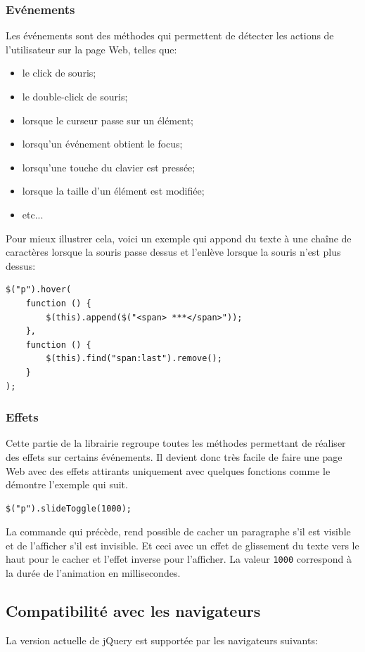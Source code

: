 \documentclass[10pt,a4paper,titlepage]{article}
\begin{document}
\subsubsection{Evénements}
Les événements sont des méthodes qui permettent de détecter les actions de l'utilisateur sur la page Web, telles que:
\begin{itemize}
	\item {le click de souris;}
	\item {le double-click de souris;}
	\item {lorsque le curseur passe sur un élément;}
	\item {lorsqu'un événement obtient le focus;}
	\item {lorsqu'une touche du clavier est pressée;}
	\item {lorsque la taille d'un élément est modifiée;}
	\item {etc...\\}
\end{itemize}

Pour mieux illustrer cela, voici un exemple qui appond du texte à une chaîne de caractères lorsque la souris passe dessus et l'enlève lorsque la souris n'est plus dessus:

\begin{lstlisting}
$("p").hover(
	function () {
		$(this).append($("<span> ***</span>"));
	}, 
	function () {
		$(this).find("span:last").remove();
	}
);
\end{lstlisting}


\subsubsection{Effets}
Cette partie de la librairie regroupe toutes les méthodes permettant de réaliser des effets sur certains événements. Il devient donc très facile de faire une page Web avec des effets attirants uniquement avec quelques fonctions comme le démontre l'exemple qui suit.

\begin{lstlisting}
$("p").slideToggle(1000);
\end{lstlisting}

La commande qui précède, rend possible de cacher un paragraphe s'il est visible et de l'afficher s'il est invisible. Et ceci avec un effet de glissement du texte vers le haut pour le cacher et l'effet inverse pour l'afficher. La valeur \texttt{1000} correspond à la durée de l'animation en millisecondes.

\subsection{Compatibilité avec les navigateurs}
La version actuelle de jQuery est supportée par les navigateurs suivants:
\end{document}
